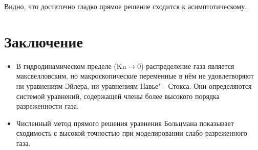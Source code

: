 \documentclass[english,russian,a4paper,12pt]{article}
\newcommand{\Kn}{\mathrm{Kn}}
\begin{document}
Видно, что достаточно гладко прямое решение сходится к асимптотическому.

\section{Заключение}

\begin{itemize}
	\item В гидродинамическом пределе (\(\Kn\to0\)) распределение газа является максвелловским,
	но макроскопические переменные в нём не удовлетворяют ни уравнениям Эйлера,
	ни уравнениям Навье"--~Стокса. Они определяются системой уравнений,
	содержащей члены более высокого порядка разреженности газа.
	\item Численный метод прямого решения уравнения Больцмана показывает сходимость
	с высокой точностью при моделировании слабо разреженного газа.
\end{itemize}



\printbibliography
\end{document}
